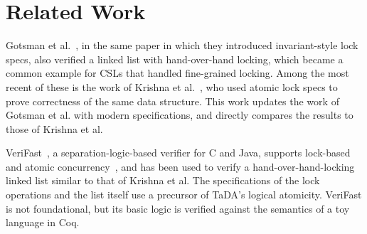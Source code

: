 \documentclass[runningheads]{llncs}
\begin{document}

\section{Related Work}
\label{related}
Gotsman et al.~\cite{gotsman}, in the same paper in which they introduced invariant-style lock specs, also verified a linked list with hand-over-hand locking, which became a common example for CSLs that handled fine-grained locking. Among the most recent of these is the work of Krishna et al.~\cite{templates}, who used atomic lock specs to prove correctness of the same data structure. This work updates the work of Gotsman et al. with modern specifications, and directly compares the results to those of Krishna et al.

VeriFast~\cite{verifast}, a separation-logic-based verifier for C and
Java, supports lock-based and atomic
concurrency~\cite{verifast-conc}, and has been used to verify a
hand-over-hand-locking linked list similar to that of Krishna et al.
The specifications of the lock operations and the list itself use
a precursor of TaDA's logical atomicity. VeriFast is not 
foundational, but its basic logic is verified
against the semantics of a toy language in Coq.

\end{document}
